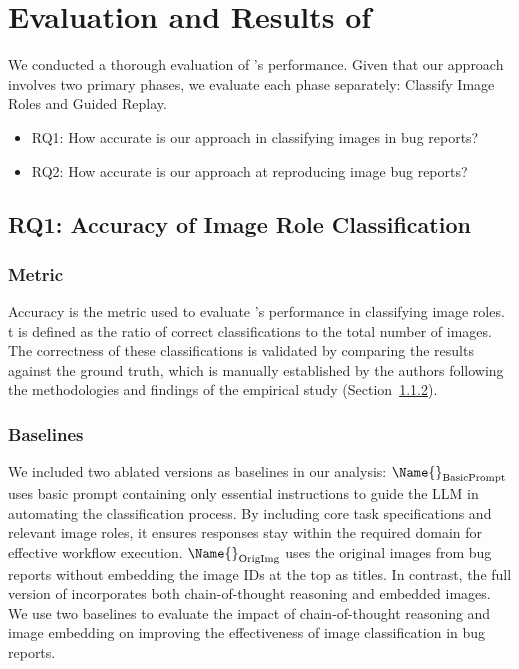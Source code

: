 




\section{Evaluation and Results of \Name{}}
We conducted a thorough evaluation of \Name{}'s performance. Given that our approach involves two primary phases, we evaluate each phase separately: 
Classify Image Roles and Guided Replay.

\begin{itemize}[leftmargin=0.35cm]
    \item RQ1: How accurate is our approach in classifying images in bug reports?
    \item RQ2: How accurate is our approach at reproducing image bug reports?
\end{itemize}


\subsection{RQ1: Accuracy of Image Role Classification}

\subsubsection{Metric} Accuracy is the metric used to evaluate \Name{}'s performance in classifying image roles. t is defined as the ratio of correct classifications to the total number of images. The correctness of these classifications is validated by comparing the results against the ground truth, which is manually established by the authors following the methodologies and findings of the empirical study (Section~\ref{}).

\subsubsection{Baselines}
We included two ablated versions as baselines in our analysis: 
\textbf{\(\Name{}_{\text{BasicPrompt}}\)} uses basic prompt containing only essential instructions to guide the LLM in automating the classification process. By including core task specifications and relevant image roles, it ensures responses stay within the required domain for effective workflow execution.
%
\textbf{\(\Name{}_{\text{OrigImg}}\)} uses the original images from bug reports without embedding the image IDs at the top as titles.
In contrast, the full version of \textbf{\Name{}} incorporates both chain-of-thought reasoning and embedded images. We use two baselines to evaluate the impact of chain-of-thought reasoning and image embedding on improving the effectiveness of image classification in bug reports.

